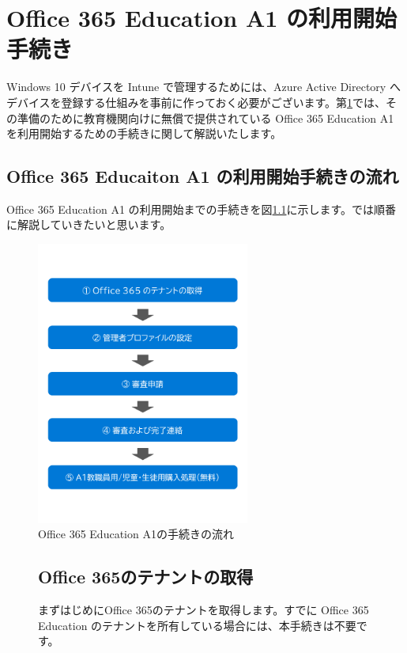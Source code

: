 \chapter{Office 365 Education A1 の利用開始手続き}\label{cap:M365A1}

Windows 10 デバイスを Intune で管理するためには、Azure Active Directory へデバイスを登録する仕組みを事前に作っておく必要がございます。第\ref{cap:M365A1}では、その準備のために教育機関向けに無償で提供されている Office 365 Education A1 を利用開始するための手続きに関して解説いたします。

\section{Office 365 Educaiton A1 の利用開始手続きの流れ}

Office 365 Education A1 の利用開始までの手続きを図\ref{fig:O365A1}に示します。では順番に解説していきたいと思います。

\begin{figure}[h]
    \centering
    \includegraphics[width=7cm]{figures/O365A1.png}
    \caption{Office 365 Education A1の手続きの流れ}
    \label{fig:O365A1}
\end{figure}

\newpage 

\begin{figure}[h]
    \begin{minipage}{1.0\textwidth}
        \section{Office 365のテナントの取得}
        \label{sec:Office365テナント取得}
            まずはじめにOffice 365のテナントを取得します。すでに Office 365 Education のテナントを所有している場合には、本手続きは不要です。
    \end{minipage}
\end{figure}

